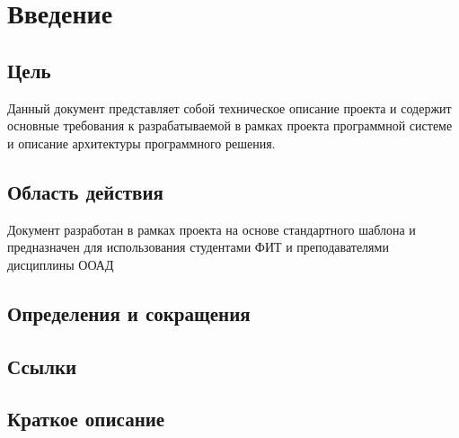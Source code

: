 \chapter{Введение}
	\section{Цель}
		Данный документ представляет собой техническое описание проекта \ProjectName и содержит основные требования к разрабатываемой в рамках проекта программной системе и описание архитектуры программного решения.
	\section{Область действия}
		Документ разработан в рамках проекта \ProjectName на основе стандартного шаблона и предназначен для использования студентами ФИТ и преподавателями дисциплины ООАД
	\section{Определения и сокращения}

	\section{Ссылки}

	\section{Краткое описание}
